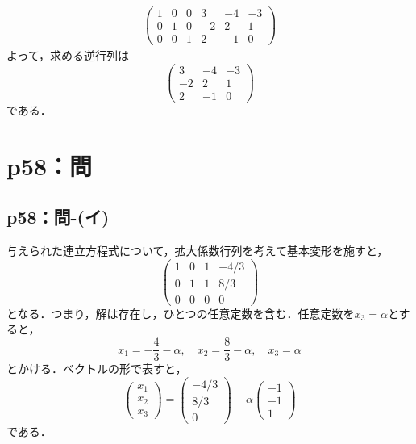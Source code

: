 \begin{tanswer}
\begin{align*}
    \left( \begin{array}{ccc|ccc}
               1 & 0 & 0 & 3  & -4 & -3 \\
               0 & 1 & 0 & -2 & 2  & 1  \\
               0 & 0 & 1 & 2  & -1 & 0
             \end{array}
    \right)
  \end{align*}
  よって，求める逆行列は
  \[
    \begin{pmatrix}
      3  & -4 & -3 \\
      -2 & 2  & 1  \\
      2  & -1 & 0
    \end{pmatrix}
  \]
  である．
\end{tanswer}




\section*{p58：問}

\subsection*{p58：問-(イ)}

\begin{tanswer}
  与えられた連立方程式について，拡大係数行列を考えて基本変形を施すと，
  \[
    \begin{pmatrix} 1 & 0 & 1 & -4/3 \\ 0 & 1 & 1 & 8/3 \\ 0 & 0 & 0 & 0 \end{pmatrix}
  \]
  となる．つまり，解は存在し，ひとつの任意定数を含む．任意定数を$ x_3 =\alpha$とすると，
  \[
    x_1 = -\frac{4}{3} - \alpha,\quad x_2 = \frac{8}{3} - \alpha,\quad x_3 = \alpha
  \]
  とかける．ベクトルの形で表すと，
  \[
    \begin{pmatrix} x_1 \\ x_2 \\ x_3 \end{pmatrix} = \begin{pmatrix} -4/3 \\ 8/3 \\ 0 \end{pmatrix} + \alpha \begin{pmatrix} -1 \\ -1 \\ 1 \end{pmatrix}
  \]
  である．
\end{tanswer}


